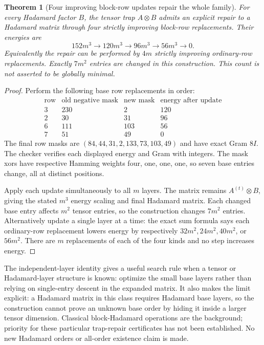 \documentclass[11pt]{article}
\newtheorem{theorem}{Theorem}[section]
\begin{document}
\begin{theorem}[Four improving block-row updates repair the whole family]
\label{thm:exchanges-four-row-repair}
For every Hadamard factor $B$, the tensor trap $A\otimes B$ admits an
explicit repair to a Hadamard matrix through four strictly improving
block-row replacements. Their energies are
\[
 152m^3\to120m^3\to96m^3\to56m^3\to0.
\]
Equivalently the repair can be performed by $4m$ strictly improving
ordinary-row replacements. Exactly $7m^2$ entries are changed in this
construction. This count is not asserted to be globally minimal.
\end{theorem}
\begin{proof}
Perform the following base row replacements in order:
\[
 \begin{array}{c|c|c|c}
 \text{row}&\text{old negative mask}&\text{new mask}&\text{energy after update}\\\hline
 3&230&2&120\\
 2&30&31&96\\
 6&111&103&56\\
 7&51&49&0
 \end{array}
\]
The final row masks are
$(84,44,31,2,133,73,103,49)$ and have exact Gram $8I$.
The checker verifies each displayed energy and Gram with integers.
The mask xors have respective Hamming weights four, one, one, one,
so seven base entries change, all at distinct positions.

Apply each update simultaneously to all $m$ layers. The matrix remains
$A^{(t)}\otimes B$, giving the stated $m^3$ energy scaling and final
Hadamard matrix. Each changed base entry affects $m^2$ tensor entries,
so the construction changes $7m^2$ entries. Alternatively update a single
layer at a time: the exact sum formula says each ordinary-row replacement
lowers energy by respectively $32m^2,24m^2,40m^2$, or $56m^2$.
There are $m$ replacements of each of the four kinds and no step
increases energy.
\end{proof}

The independent-layer identity gives a useful search rule when a tensor
or Hadamard-layer structure is known: optimize the small base layers
rather than relying on single-entry descent in the expanded matrix.
It also makes the limit explicit: a Hadamard matrix in this class
requires Hadamard base layers, so the construction cannot prove an
unknown base order by hiding it inside a larger tensor dimension.
Classical block-Hadamard operations are the background; priority for
these particular trap-repair certificates has not been established.
No new Hadamard orders or all-order existence claim is made.
\end{document}
